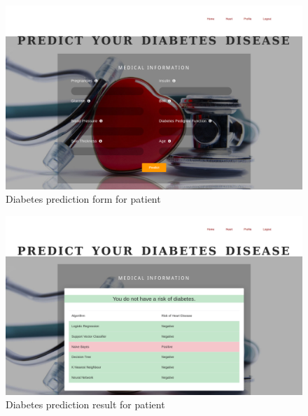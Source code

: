 \documentclass[oneside,12pt]{Classes/VTU}
\begin{document}
    			\begin{figure}
    				\begin{center}
    				\includegraphics[width=17cm]{Screenshots/diabetes-form.PNG}
    				\caption{Diabetes prediction form for patient}
    				\end{center}
    			\end{figure}
    			
    			\begin{figure}
    				\begin{center}
    				\includegraphics[width=17cm]{Screenshots/diabetes-result.PNG}
    				\caption{Diabetes prediction result for patient}
    				\end{center}
    			\end{figure}
    			
\end{document}
